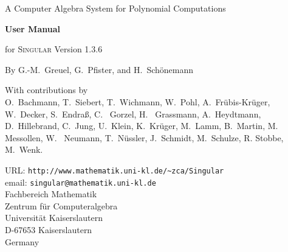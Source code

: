 \documentclass[a4paper,german]{article}
\begin{document}

\begin{center}
\begin{figure}[h]
\noindent
\centering{}
\end{figure}

    {\Large A Computer Algebra System for Polynomial Computations}

\vspace{15ex}

\Huge{\textbf{User Manual}}

\huge{for \textsc{Singular} Version 1.3.6}

\vspace{5ex}

\Large{By G.-M.~Greuel, G.~Pfister, and H.~Sch\"onemann}
\end{center}

\begin{center}
  \large{With contributions by} \\
\large{O.~Bachmann, T.~Siebert, T.~Wichmann, W.~Pohl,
A.~Fr\"ubis-Kr\"uger, W.~Decker, S.~Endra\ss, C.~ Gorzel, H.~ Grassmann,
A.~Heydtmann, D.~Hillebrand, C.~Jung, U.~Klein, K.~Kr\"uger, M.~Lamm,
B.~Martin, M.~ Messollen, W.~ Neumann, T.~N\"ussler, J.~Schmidt, M.~Schulze, R.
Stobbe, M.~Wenk.}
\end{center}

\vspace{20ex}

\begin{center}
  \large{
    URL: \verb?http://www.mathematik.uni-kl.de/~zca/Singular? \\
    email: \verb?singular@mathematik.uni-kl.de?\\
    Fachbereich Mathematik \\
    Zentrum f\"ur Computeralgebra \\
    Universit\"at Kaiserslautern \\
    D-67653 Kaiserslautern \\
    Germany}
\end{center}
\end{document}
